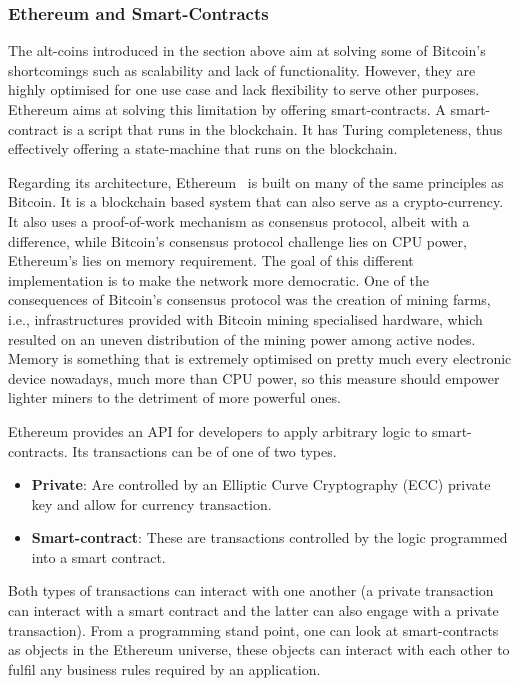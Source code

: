 \subsubsection{Ethereum and Smart-Contracts}
\label{rel:ethereum}

\noindent The alt-coins introduced in the section above aim at solving some of Bitcoin's shortcomings such as scalability and lack of functionality. However, they are highly optimised for one use case and lack flexibility to serve other purposes. Ethereum aims at solving this limitation by offering smart-contracts. A smart-contract is a script that runs in the blockchain. It has Turing completeness, thus effectively offering a state-machine that runs on the blockchain.

Regarding its architecture, Ethereum~\cite{Wood:2014ur,Buterin:2013ux} is built on many of the same principles as Bitcoin. It is a blockchain based system that can also serve as a crypto-currency. It also uses a proof-of-work mechanism as consensus protocol, albeit with a difference, while Bitcoin's consensus protocol challenge lies on CPU power, Ethereum's lies on memory requirement. The goal of this different implementation is to make the network more democratic. One of the consequences of Bitcoin's consensus protocol was the creation of mining farms, i.e., infrastructures provided with Bitcoin mining specialised hardware, which resulted on an uneven distribution of the mining power among active nodes. Memory is something that is extremely optimised on pretty much every electronic device nowadays, much more than CPU power, so this measure should empower lighter miners to the detriment of more powerful ones.

Ethereum provides an API for developers to apply arbitrary logic to smart-contracts. Its transactions can be of one of two types.

\begin{itemize}
\item \textbf{Private}: Are controlled by an Elliptic Curve Cryptography (ECC) private key and allow for currency transaction.
\item \textbf{Smart-contract}: These are transactions controlled by the logic programmed into a smart contract.
\end{itemize}

Both types of transactions can interact with one another (a private transaction can interact with a smart contract and the latter can also engage with a private transaction).
From a programming stand point, one can look at smart-contracts as objects in the Ethereum universe, these objects can interact with each other to fulfil any business rules required by an application.

